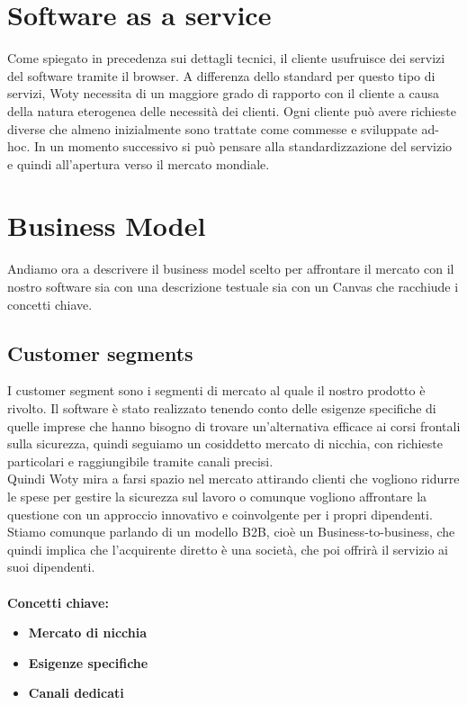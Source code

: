 \section{Software as a service}
Come spiegato in precedenza sui dettagli tecnici, il cliente usufruisce dei servizi del software tramite il browser. A differenza dello standard per questo tipo di servizi, Woty necessita di un maggiore grado di rapporto con il cliente a causa della natura eterogenea delle necessità dei clienti. Ogni cliente può avere richieste diverse che almeno inizialmente sono trattate come commesse e sviluppate ad-hoc. In un momento successivo si può pensare alla standardizzazione del servizio e quindi all'apertura verso il mercato mondiale.




\section{Business Model}
Andiamo ora a descrivere il business model scelto per affrontare il mercato con il nostro software sia con una descrizione testuale sia con un Canvas che racchiude i concetti chiave.

\subsection{Customer segments}
I customer segment sono i segmenti di mercato al quale il nostro prodotto è rivolto. Il software è stato realizzato tenendo conto delle esigenze specifiche di quelle imprese che hanno bisogno di trovare un'alternativa efficace ai corsi frontali sulla sicurezza, quindi seguiamo un cosiddetto mercato di nicchia, con richieste particolari e raggiungibile tramite canali precisi. \\
Quindi Woty mira a farsi spazio nel mercato attirando clienti che vogliono ridurre le spese per gestire la sicurezza sul lavoro o comunque vogliono affrontare la questione con un approccio innovativo e coinvolgente per i propri dipendenti. \\
Stiamo comunque parlando di un modello B2B, cioè un Business-to-business, che quindi implica che l'acquirente diretto è una società, che poi offrirà il servizio ai suoi dipendenti.\\
\\ \textbf{Concetti chiave:}
\begin{itemize}
\item \textbf{Mercato di nicchia}
\item \textbf{Esigenze specifiche}
\item \textbf{Canali dedicati}
\end{itemize}

